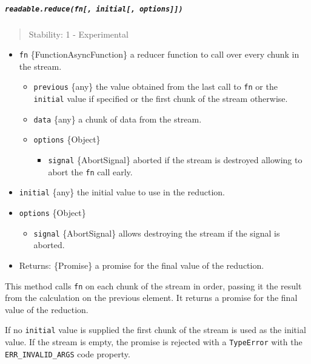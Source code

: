 \subparagraph{\texorpdfstring{\texttt{readable.reduce(fn{[},\ initial{[},\ options{]}{]})}}{readable.reduce(fn{[}, initial{[}, options{]}{]})}}\label{readable.reducefn-initial-options}

\begin{quote}
Stability: 1 - Experimental
\end{quote}

\begin{itemize}
\tightlist
\item
  \texttt{fn} \{Function\textbar AsyncFunction\} a reducer function to
  call over every chunk in the stream.

  \begin{itemize}
  \tightlist
  \item
    \texttt{previous} \{any\} the value obtained from the last call to
    \texttt{fn} or the \texttt{initial} value if specified or the first
    chunk of the stream otherwise.
  \item
    \texttt{data} \{any\} a chunk of data from the stream.
  \item
    \texttt{options} \{Object\}

    \begin{itemize}
    \tightlist
    \item
      \texttt{signal} \{AbortSignal\} aborted if the stream is destroyed
      allowing to abort the \texttt{fn} call early.
    \end{itemize}
  \end{itemize}
\item
  \texttt{initial} \{any\} the initial value to use in the reduction.
\item
  \texttt{options} \{Object\}

  \begin{itemize}
  \tightlist
  \item
    \texttt{signal} \{AbortSignal\} allows destroying the stream if the
    signal is aborted.
  \end{itemize}
\item
  Returns: \{Promise\} a promise for the final value of the reduction.
\end{itemize}

This method calls \texttt{fn} on each chunk of the stream in order,
passing it the result from the calculation on the previous element. It
returns a promise for the final value of the reduction.

If no \texttt{initial} value is supplied the first chunk of the stream
is used as the initial value. If the stream is empty, the promise is
rejected with a \texttt{TypeError} with the \texttt{ERR\_INVALID\_ARGS}
code property.

